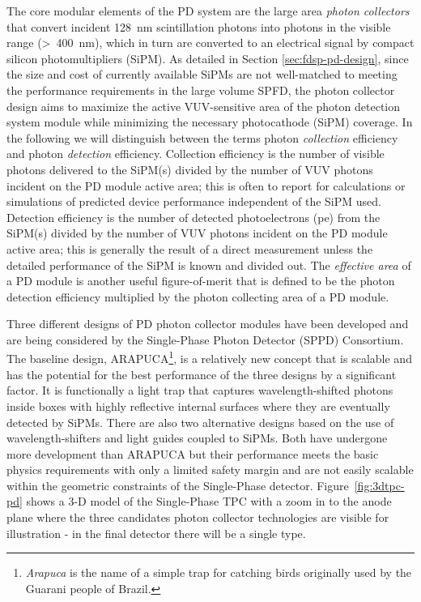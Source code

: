 The core modular elements of the PD system are the large area {\it photon collectors} that convert incident \SI{128}{nm} scintillation photons into photons in the visible range (>~\SI{400}{nm}), which in turn are converted to an electrical signal by compact silicon photomultipliers (SiPM). 
As detailed in Section \ref{sec:fdsp-pd-design}, since the size and cost of currently available SiPMs are not well-matched to meeting the performance requirements in the large volume  SPFD, the photon collector design aims to maximize the active VUV-sensitive area of the photon detection system module while minimizing the necessary photocathode (SiPM) coverage. 
In the following we will distinguish between the terms photon {\it collection} efficiency and photon {\it detection} efficiency. Collection efficiency is the number of visible photons delivered to the SiPM(s) divided by the number of VUV photons incident on the PD module active area; this is often to report for calculations or simulations of predicted device performance independent of the SiPM used.  Detection efficiency is the number of detected photoelectrons (pe) from the SiPM(s) divided by the number of VUV photons incident on the PD module active area; this is generally the result of a direct measurement unless the detailed performance of the SiPM is known and divided out. The {\it effective area} of a PD module is another useful figure-of-merit that is defined to be the photon detection efficiency multiplied by the photon collecting area of a PD module. 

Three different designs of PD photon collector modules have been developed and are being considered by the Single-Phase Photon Detector (SPPD) Consortium. The baseline design, ARAPUCA\footnote{{\it Arapuca} is the name of a simple trap for catching birds originally used by the Guarani people of Brazil.}, is a relatively new concept that is scalable and has the potential for the best performance of the three designs by a significant factor. It is functionally a light trap that captures wavelength-shifted photons inside boxes with highly reflective internal surfaces where they are eventually detected by SiPMs.  There are also two alternative designs based on the use of wavelength-shifters and light guides coupled to SiPMs. Both have undergone more development than ARAPUCA but their performance meets the basic physics requirements with only a limited safety margin and are not easily scalable within the geometric constraints of the Single-Phase detector.
Figure~\ref{fig:3dtpc-pd} shows a 3-D model of the Single-Phase TPC with a zoom in to the anode plane where the three candidates photon collector technologies are visible for illustration - in the final detector there will be a single type.

